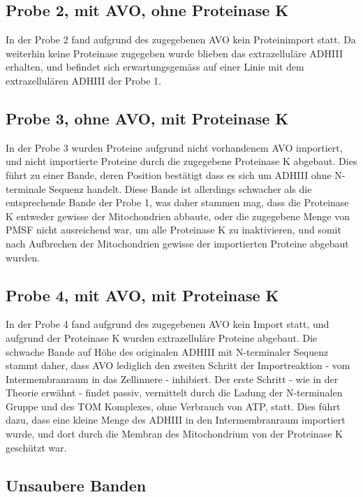 \documentclass[a4paper,german]{scrreprt}
\begin{document}
\subsection{Probe 2, mit AVO, ohne Proteinase K}

In der Probe 2 fand aufgrund des zugegebenen AVO kein Proteinimport statt. Da
weiterhin keine Proteinase zugegeben wurde blieben das extrazelluläre ADHIII
erhalten, und befindet sich erwartungsgemäss auf einer Linie mit dem
extrazellulären ADHIII der Probe 1.

\subsection{Probe 3, ohne AVO, mit Proteinase K}

In der Probe 3 wurden Proteine aufgrund nicht vorhandenem AVO importiert, und
nicht importierte Proteine durch die zugegebene Proteinase K abgebaut. Dies
führt zu einer Bande, deren Position bestätigt dass es sich um ADHIII ohne
N-terminale Sequenz handelt. Diese Bande ist allerdings schwacher als die
entsprechende Bande der Probe 1, was daher stammen mag, dass die Proteinase K
entweder gewisse der Mitochondrien abbaute, oder die zugegebene Menge von PMSF
nicht ausreichend war, um alle Proteinase K zu inaktivieren, und somit nach
Aufbrechen der Mitochondrien gewisse der importierten Proteine abgebaut wurden.

\subsection{Probe 4, mit AVO, mit Proteinase K}

In der Probe 4 fand aufgrund des zugegebenen AVO kein Import statt, und
aufgrund der Proteinase K wurden extrazelluläre Proteine abgebaut. Die schwache
Bande auf Höhe des originalen ADHIII mit N-terminaler Sequenz stammt daher,
dass AVO lediglich den zweiten Schritt der Importreaktion - vom
Intermembranraum in das Zellinnere - inhibiert. Der erste Schritt - wie in der
Theorie erwähnt - findet passiv, vermittelt durch die Ladung der N-terminalen
Gruppe und des TOM Komplexes, ohne Verbrauch von ATP, statt. Dies führt dazu,
dass eine kleine Menge des ADHIII in den Intermembranraum importiert wurde, und
dort durch die Membran des Mitochondrium von der Proteinase K geschützt war.

\subsection{Unsaubere Banden}
\end{document}
